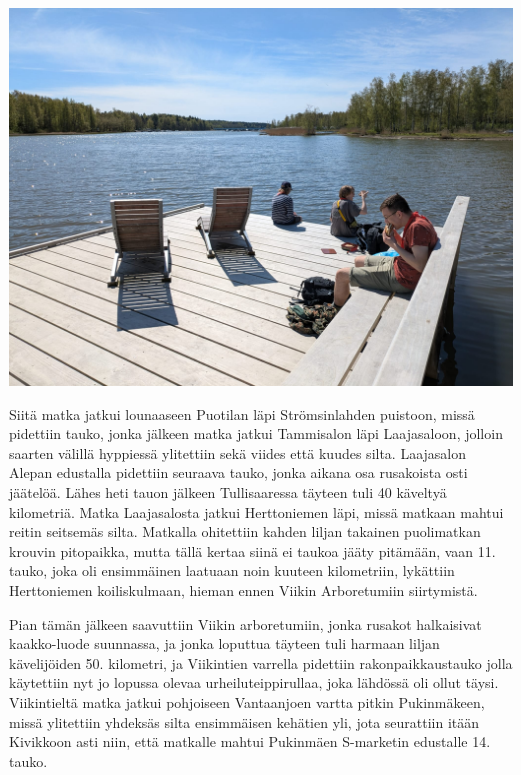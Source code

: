 \begin{multicols}{2}
\smallskip
\noindent\includegraphics[width=\linewidth]{assets/liljaranta.jpeg}

Siitä matka jatkui lounaaseen Puotilan läpi Strömsinlahden puistoon, missä pidettiin tauko, jonka jälkeen matka jatkui Tammisalon läpi Laajasaloon, jolloin saarten välillä hyppiessä ylitettiin sekä viides että kuudes silta. Laajasalon Alepan edustalla pidettiin seuraava tauko, jonka aikana osa rusakoista osti jäätelöä. Lähes heti tauon jälkeen Tullisaaressa täyteen tuli 40 käveltyä kilometriä. Matka Laajasalosta jatkui Herttoniemen läpi, missä matkaan mahtui reitin seitsemäs silta. Matkalla ohitettiin kahden liljan takainen puolimatkan krouvin pitopaikka, mutta tällä kertaa siinä ei taukoa jääty pitämään, vaan 11. tauko, joka oli ensimmäinen laatuaan noin kuuteen kilometriin, lykättiin Herttoniemen koiliskulmaan, hieman ennen Viikin Arboretumiin siirtymistä.

Pian tämän jälkeen saavuttiin Viikin arboretumiin, jonka rusakot halkaisivat kaakko-luode suunnassa, ja jonka loputtua täyteen tuli harmaan liljan kävelijöiden 50. kilometri, ja Viikintien varrella pidettiin rakonpaikkaustauko jolla käytettiin nyt jo lopussa olevaa urheiluteippirullaa, joka lähdössä oli ollut täysi. Viikintieltä matka jatkui pohjoiseen Vantaanjoen vartta pitkin Pukinmäkeen, missä ylitettiin yhdeksäs silta ensimmäisen kehätien yli, jota seurattiin itään Kivikkoon asti niin, että matkalle mahtui Pukinmäen S-marketin edustalle 14. tauko.


\end{multicols}
